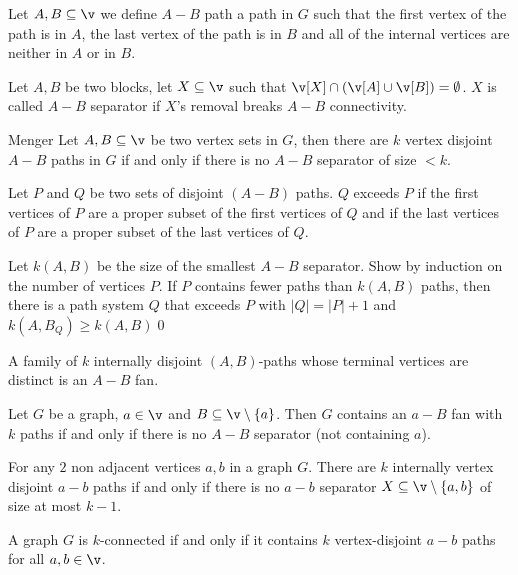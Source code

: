 \begin{definition}[$A - B$ path]
    Let $A, B \subseteq \v$ we define $A - B$ path a path in $G$ such that the first vertex of the path is in $A$, the last vertex of the path is in $B$ and all of the internal vertices are neither in $A$ or in $B$.    
\end{definition}
\begin{definition}[$A - B$ separator]
    Let $A, B$ be two blocks, let $X \subseteq \v$ such that $\v[X] \cap (\v[A] \cup \v[B]) = \emptyset$. $X$ is called $A - B$ separator if $X$'s  removal breaks $A - B$ connectivity.
\end{definition}
\begin{customtheorem}{Menger}
\label{theorem:menger}
    Let $A, B \subseteq \v$ be two vertex sets in $G$, then there are $k$ vertex disjoint $A - B$ paths in $G$ if and only if there is no $A - B$ separator of size $< k$.
\end{customtheorem}
\begin{prf}
    Let $P$ and $Q$ be two sets of disjoint $(A - B)$ paths. $Q$ exceeds $P$ if the first vertices of $P$ are a proper subset of the first vertices of $Q$ and if the last vertices of $P$ are a proper subset of the last vertices of $Q$.

    Let $k(A, B)$ be the size of the smallest $A - B$ separator. Show by induction on the number of vertices $P$. If $P$ contains fewer paths than $k(A, B)$ paths, then there is a path system $Q$ that exceeds $P$ with $|Q| = |P| + 1$ and $k(A, B_Q) \geq k(A, B)$\qed
\end{prf}
\begin{definition}[$A - B$ fan]
    A family of $k$ internally disjoint $(A, B)$-paths whose terminal vertices are distinct is an $A - B$ fan.
\end{definition}
\begin{customcorollary}{3.7}
\label{corollary:3.7}
    Let $G$ be a graph, $a \in \v$ and $B \subseteq \v \setminus \{a\}$. Then $G$ contains an $a - B$ fan with $k$ paths if and only if there is no $A - B$ separator (not containing $a$).
\end{customcorollary}
\begin{customcorollary}{3.8}
\label{corollary:3.8}
    For any $2$ non adjacent vertices $a, b$ in a graph $G$. There are $k$ internally vertex disjoint $a - b$ paths if and only if there is no $a - b$ separator $X \subseteq \v \setminus \{a, b\}$ of size at most $k - 1$.
\end{customcorollary}
\begin{customcorollary}{3.9}
\label{corollary:3.9}
    A graph $G$ is $k$-connected if and only if it contains $k$ vertex-disjoint $a - b$ paths for all $a, b \in \v$.
\end{customcorollary}
